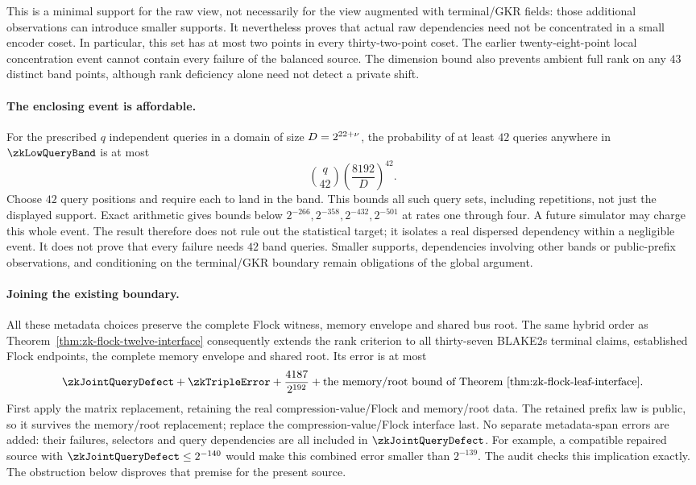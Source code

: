 This is a minimal support for the raw view, not necessarily for the view augmented with terminal/GKR fields: those additional observations can introduce smaller supports. It nevertheless proves that actual raw dependencies need not be concentrated in a small encoder coset. In particular, this set has at most two points in every thirty-two-point coset. The earlier twenty-eight-point local concentration event cannot contain every failure of the balanced source. The dimension bound also prevents ambient full rank on any $43$ distinct band points, although rank deficiency alone need not detect a private shift.

\paragraph{The enclosing event is affordable.} For the prescribed $q$ independent queries in a domain of size $D=2^{22+\nu}$, the probability of at least $42$ queries anywhere in $\zkLowQueryBand$ is at most
\[
 \binom q{42}\left(\frac{8192}{D}\right)^{42}.
\]
Choose $42$ query positions and require each to land in the band. This bounds all such query sets, including repetitions, not just the displayed support. Exact arithmetic gives bounds below $2^{-266},2^{-358},2^{-432},2^{-501}$ at rates one through four. A future simulator may charge this whole event. The result therefore does not rule out the statistical target; it isolates a real dispersed dependency within a negligible event. It does not prove that every failure needs $42$ band queries. Smaller supports, dependencies involving other bands or public-prefix observations, and conditioning on the terminal/GKR boundary remain obligations of the global argument.

\paragraph{Joining the existing boundary.} All these metadata choices preserve the complete Flock witness, memory envelope and shared bus root. The same hybrid order as Theorem~\ref{thm:zk-flock-twelve-interface} consequently extends the rank criterion to all thirty-seven BLAKE2s terminal claims, established Flock endpoints, the complete memory envelope and shared root. Its error is at most
\[
 \zkJointQueryDefect+\zkTripleError+\frac{4187}{2^{192}}
 +\text{the memory/root bound of Theorem~\ref{thm:zk-flock-leaf-interface}}.
\]
First apply the matrix replacement, retaining the real compression-value/Flock and memory/root data. The retained prefix law is public, so it survives the memory/root replacement; replace the compression-value/Flock interface last. No separate metadata-span errors are added: their failures, selectors and query dependencies are all included in $\zkJointQueryDefect$. For example, a compatible repaired source with $\zkJointQueryDefect\le2^{-140}$ would make this combined error smaller than $2^{-139}$. The audit checks this implication exactly. The obstruction below disproves that premise for the present source.

